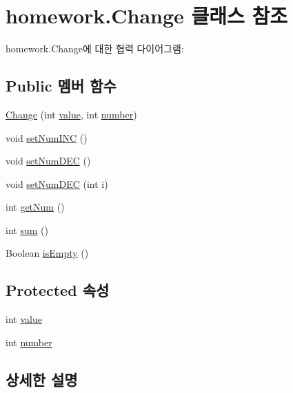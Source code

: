 \hypertarget{classhomework_1_1_change}{}\section{homework.\+Change 클래스 참조}
\label{classhomework_1_1_change}


homework.\+Change에 대한 협력 다이어그램\+:
\subsection*{Public 멤버 함수}
\begin{DoxyCompactItemize}
\item 
\hyperlink{classhomework_1_1_change_a0c6c8870e13d6d3cc966a3d767707c0f}{Change} (int \hyperlink{classhomework_1_1_change_a4639252147d1aea40044d63a1d320061}{value}, int \hyperlink{classhomework_1_1_change_a41ba89697443264b7d754f84c6153888}{number})
\item 
void \hyperlink{classhomework_1_1_change_a4492006ce3169a4e9f3bb294ec1f8950}{set\+Num\+I\+NC} ()
\item 
void \hyperlink{classhomework_1_1_change_a2cdb0a927058954d7c8586cfe2344b40}{set\+Num\+D\+EC} ()
\item 
void \hyperlink{classhomework_1_1_change_a62a6aa10faaaba2c7ac97c6bd9a57ec8}{set\+Num\+D\+EC} (int i)
\item 
int \hyperlink{classhomework_1_1_change_acd58219ef7f6cb83962c0d634596d1c2}{get\+Num} ()
\item 
int \hyperlink{classhomework_1_1_change_a3440af845c37748236125edaa4802121}{sum} ()
\item 
Boolean \hyperlink{classhomework_1_1_change_ab1294e088a156e1fd723a22eb97641cc}{is\+Empty} ()
\end{DoxyCompactItemize}
\subsection*{Protected 속성}
\begin{DoxyCompactItemize}
\item 
int \hyperlink{classhomework_1_1_change_a4639252147d1aea40044d63a1d320061}{value}
\item 
int \hyperlink{classhomework_1_1_change_a41ba89697443264b7d754f84c6153888}{number}
\end{DoxyCompactItemize}


\subsection{상세한 설명}


